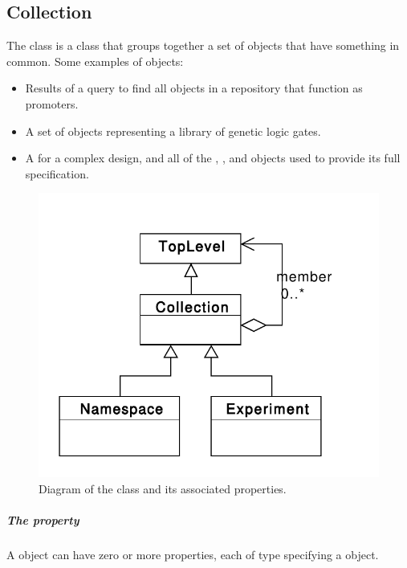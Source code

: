 \subsection {Collection}
\label{sec:Collection}
The  class is a class that groups together a set of  objects that have something in common.
Some examples of  objects:
\begin{itemize}
\item Results of a query to find all  objects in a repository that function as promoters.
\item A set of  objects representing a library of genetic logic gates.
\item A  for a complex design, and all of the , , and  objects used to provide its full specification.
\end{itemize}

\begin{figure}[ht]
\begin{center}
\includegraphics[scale=0.6]{uml/collection}
\caption[]{Diagram of the  class and its associated properties.}
\label{uml:collection}
\end{center}
\end{figure}

\subparagraph{The  property}\label{sec:member}
A  object can have zero or more  properties, each of type  specifying a  object.

